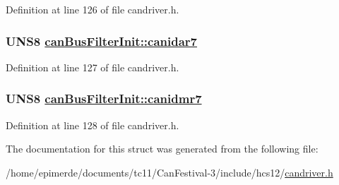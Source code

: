 Definition at line 126 of file candriver.h.\hypertarget{structcanBusFilterInit_5c00e7405a498d9eb55816573f12c125}{
\subsubsection[canidar7]{\setlength{\rightskip}{0pt plus 5cm}UNS8 \hyperlink{structcanBusFilterInit_5c00e7405a498d9eb55816573f12c125}{can\-Bus\-Filter\-Init::canidar7}}}
\label{structcanBusFilterInit_5c00e7405a498d9eb55816573f12c125}




Definition at line 127 of file candriver.h.\hypertarget{structcanBusFilterInit_cde13291ed4cd72f9818efeb50a254fd}{
\subsubsection[canidmr7]{\setlength{\rightskip}{0pt plus 5cm}UNS8 \hyperlink{structcanBusFilterInit_cde13291ed4cd72f9818efeb50a254fd}{can\-Bus\-Filter\-Init::canidmr7}}}
\label{structcanBusFilterInit_cde13291ed4cd72f9818efeb50a254fd}




Definition at line 128 of file candriver.h.

The documentation for this struct was generated from the following file:\begin{CompactItemize}
\item 
/home/epimerde/documents/tc11/Can\-Festival-3/include/hcs12/\hyperlink{candriver_8h}{candriver.h}\end{CompactItemize}
